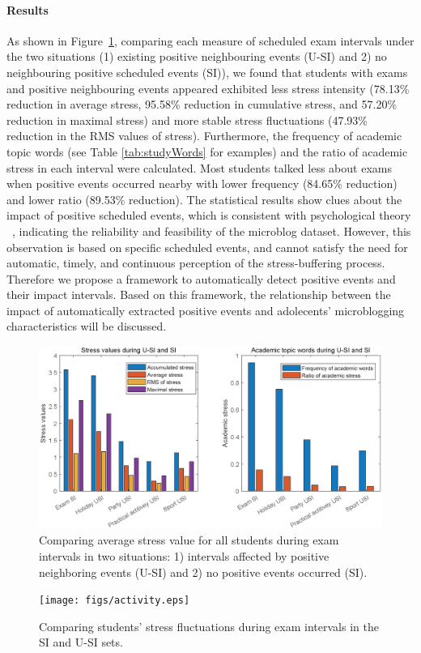\paragraph{Results}
As shown in Figure~\ref{fig:frequencyBar},
comparing each measure of scheduled exam intervals under the two situations
(1) existing positive neighbouring events (U-SI) and 2) no neighbouring positive scheduled events (SI)),
we found that students
with exams and positive neighbouring events appeared exhibited less stress intensity
(78.13\% reduction in average stress, 95.58\%  reduction in cumulative stress, and 57.20\%  reduction in maximal stress)
and more stable stress fluctuations (47.93\% reduction in the RMS values of stress).
Furthermore, the frequency of academic topic words (see Table \ref{tab:studyWords} for examples)
and the ratio of academic stress in each interval were calculated.
Most students talked less about exams when positive events occurred nearby with lower frequency (84.65\% reduction) and lower ratio (89.53\% reduction).
The statistical results show clues about the impact of positive scheduled events,
which is consistent with psychological theory ~\citep{Cohen1984Positive, Cohen2010Positive, Needles1990Positive},
indicating the reliability and feasibility of the microblog dataset.
However,
this observation is based on specific scheduled events,
and cannot satisfy the need for automatic, timely, and continuous perception of the stress-buffering process.
Therefore we propose a framework to automatically detect positive events and their impact intervals.
Based on this framework,
the relationship between the impact of automatically extracted positive events
and adolecents' microblogging characteristics will be discussed.

\begin{figure}[h]
\centering
\includegraphics[width=\linewidth]{figs/barUSI.eps}
\caption{\small{
Comparing average stress value for all students during exam intervals in two situations:
1) intervals affected by positive neighboring events (U-SI) and 2) no positive events occurred (SI).
}}
\label{fig:frequencyBar}
\end{figure}

\begin{figure}[h]
\centering
\texttt{[image: figs/activity.eps]}
\caption{\small{Comparing students' stress fluctuations during exam intervals in the SI and U-SI sets.}}
\label{fig:frequency}
\end{figure}
